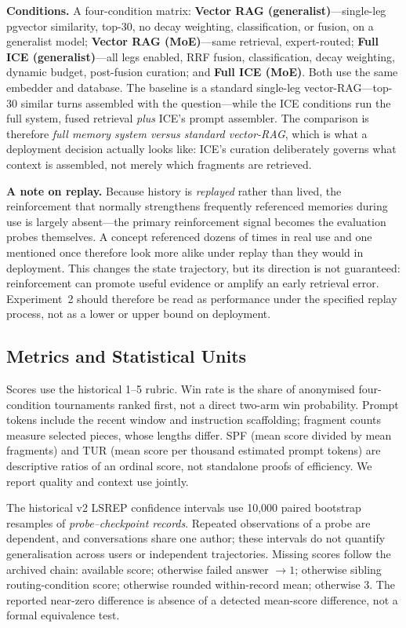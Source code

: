 \documentclass[11pt,a4paper]{article}
\begin{document}
\textbf{Conditions.} A four-condition matrix: \textbf{Vector RAG (generalist)}---single-leg pgvector similarity, top-30, no decay weighting, classification, or fusion, on a generalist model; \textbf{Vector RAG (MoE)}---same retrieval, expert-routed; \textbf{Full ICE (generalist)}---all legs enabled, RRF fusion, classification, decay weighting, dynamic budget, post-fusion curation; and \textbf{Full ICE (MoE)}. Both use the same embedder and database. The baseline is a standard single-leg vector-RAG---top-30 similar turns assembled with the question---while the ICE conditions run the full system, fused retrieval \emph{plus} ICE's prompt assembler. The comparison is therefore \emph{full memory system versus standard vector-RAG}, which is what a deployment decision actually looks like: ICE's curation deliberately governs what context is assembled, not merely which fragments are retrieved.

\textbf{A note on replay.} Because history is \emph{replayed} rather than lived, the reinforcement that normally strengthens frequently referenced memories during use is largely absent---the primary reinforcement signal becomes the evaluation probes themselves. A concept referenced dozens of times in real use and one mentioned once therefore look more alike under replay than they would in deployment. This changes the state trajectory, but its direction is not guaranteed: reinforcement can promote useful evidence or amplify an early retrieval error. Experiment~2 should therefore be read as performance under the specified replay process, not as a lower or upper bound on deployment.

\subsection{Metrics and Statistical Units}
Scores use the historical 1--5 rubric. Win rate is the share of anonymised four-condition tournaments ranked first, not a direct two-arm win probability. Prompt tokens include the recent window and instruction scaffolding; fragment counts measure selected pieces, whose lengths differ. SPF (mean score divided by mean fragments) and TUR (mean score per thousand estimated prompt tokens) are descriptive ratios of an ordinal score, not standalone proofs of efficiency. We report quality and context use jointly.

The historical v2 LSREP confidence intervals use 10,000 paired bootstrap resamples of \emph{probe--checkpoint records}. Repeated observations of a probe are dependent, and conversations share one author; these intervals do not quantify generalisation across users or independent trajectories. Missing scores follow the archived chain: available score; otherwise failed answer $\to1$; otherwise sibling routing-condition score; otherwise rounded within-record mean; otherwise 3. The reported near-zero difference is absence of a detected mean-score difference, not a formal equivalence test.
\end{document}

